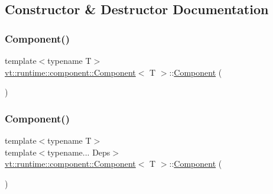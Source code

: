 \subsection{Constructor \& Destructor Documentation}
\mbox{\label{structvt_1_1runtime_1_1component_1_1_component_ab954824329584814bb652ea810cd62e3}} 
\subsubsection{\texorpdfstring{Component()}{Component()}\hspace{0.1cm}{\footnotesize\ttfamily [1/2]}}
{\footnotesize\ttfamily template$<$typename T$>$ \\
\hyperlink{structvt_1_1runtime_1_1component_1_1_component}{vt\+::runtime\+::component\+::\+Component}$<$ T $>$\+::\hyperlink{structvt_1_1runtime_1_1component_1_1_component}{Component} (\begin{DoxyParamCaption}{ }\end{DoxyParamCaption})\hspace{0.3cm}{\ttfamily [default]}}

\mbox{\label{structvt_1_1runtime_1_1component_1_1_component_a1a94c1d493860adff6ae69c5eb31bb3f}} 
\subsubsection{\texorpdfstring{Component()}{Component()}\hspace{0.1cm}{\footnotesize\ttfamily [2/2]}}
{\footnotesize\ttfamily template$<$typename T$>$ \\
template$<$typename... Deps$>$ \\
\hyperlink{structvt_1_1runtime_1_1component_1_1_component}{vt\+::runtime\+::component\+::\+Component}$<$ T $>$\+::\hyperlink{structvt_1_1runtime_1_1component_1_1_component}{Component} (\begin{DoxyParamCaption}\item[{\hyperlink{structvt_1_1runtime_1_1component_1_1_base_component_1_1_deps_pack}{Deps\+Pack}$<$ Deps... $>$}]{ }\end{DoxyParamCaption})\hspace{0.3cm}{\ttfamily [inline]}}



